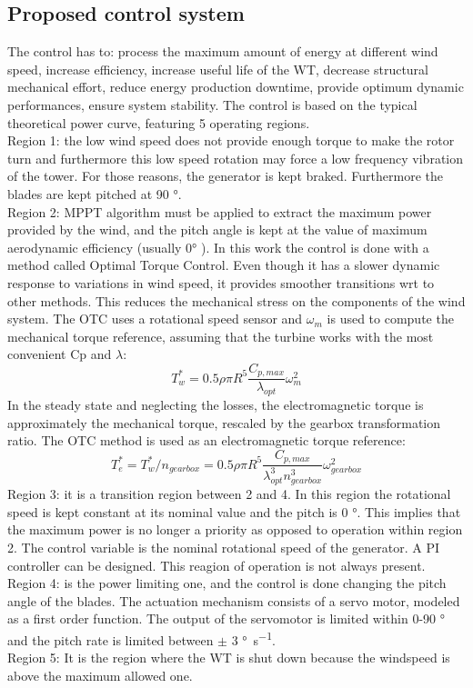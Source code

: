 \documentclass[]{article}
\begin{document}
\subsection{Proposed control system}
The control has to: process the maximum amount of energy at different wind speed, increase efficiency, increase useful life of the WT, decrease structural mechanical effort, reduce energy production downtime, provide optimum dynamic performances, ensure system stability. The control is based on the typical theoretical power curve, featuring 5 operating regions.\\
Region 1: the low wind speed does not provide enough torque to make the rotor turn and furthermore this low speed rotation may force a low frequency vibration of the tower. For those reasons, the generator is kept braked. Furthermore the blades are kept pitched at 90 \si{\degree}.\\
Region 2: MPPT algorithm must be applied to extract the maximum power provided by the wind, and the pitch angle is kept at the value of maximum aerodynamic efficiency (usually 0\si{\degree} ). In this work the control is done with a method called Optimal Torque Control. Even though it has a slower dynamic response to variations in wind speed, it provides smoother transitions wrt to other methods. This reduces the mechanical stress on the components of the wind system. The OTC uses a rotational speed sensor and $\omega_m$ is used to compute the mechanical torque reference, assuming that the turbine works with the most convenient Cp and $\lambda$: 
\begin{equation}
	T_{w}^*=0.5 \rho \pi R^5 \frac{C_{p,max}}{\lambda_{opt}}\omega_m^2
\end{equation} 
In the steady state and neglecting the losses, the electromagnetic torque is approximately the mechanical torque, rescaled by the gearbox transformation ratio. The OTC method is used as an electromagnetic torque reference:
\begin{equation}
	T_e^* = T_{w}^*/n_{gearbox}=0.5 \rho \pi R^5 \frac{C_{p,max}}{\lambda_{opt}^3n_{gearbox}^3}\omega_{gearbox}^2
\end{equation}
Region 3: it is a transition region between 2 and 4. In this region the rotational speed is kept constant at its nominal value and the pitch is 0 \si{\degree}. This implies that the maximum power is no longer a priority as opposed to operation within region 2. The control variable is the nominal rotational speed of the generator. A PI controller can be designed.  This reagion of operation is not always present.\\
Region 4: is the power limiting one, and the control is done changing the pitch angle of the blades. The actuation mechanism consists of a servo motor, modeled as a first order function. The output of the servomotor is limited within 0-90 \si{\degree} and the pitch rate is limited between $\pm$ 3 \si{\degree \per \second}.\\
Region 5: It is the region where the WT is shut down because the windspeed is above the maximum allowed one.
\end{document}
